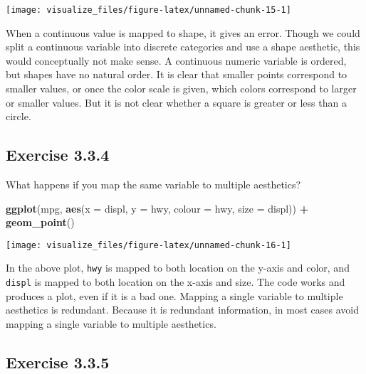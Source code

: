 \documentclass[]{book}
\newenvironment{Shaded}{\begin{snugshade}}{\end{snugshade}}
\newcommand{\DataTypeTok}[1]{\textcolor[rgb]{0.13,0.29,0.53}{#1}}
\newcommand{\KeywordTok}[1]{\textcolor[rgb]{0.13,0.29,0.53}{\textbf{#1}}}
\newcommand{\NormalTok}[1]{#1}
\newcommand{\OperatorTok}[1]{\textcolor[rgb]{0.81,0.36,0.00}{\textbf{#1}}}
\newcommand{\StringTok}[1]{\textcolor[rgb]{0.31,0.60,0.02}{#1}}
\theoremstyle{plain}
\theoremstyle{remark}
\begin{document}
\begin{center}\texttt{[image: visualize\_files/figure-latex/unnamed-chunk-15-1]} \end{center}

When a continuous value is mapped to shape, it gives an error. Though we
could split a continuous variable into discrete categories and use a
shape aesthetic, this would conceptually not make sense. A continuous
numeric variable is ordered, but shapes have no natural order. It is
clear that smaller points correspond to smaller values, or once the
color scale is given, which colors correspond to larger or smaller
values. But it is not clear whether a square is greater or less than a
circle.

\hypertarget{exercise-3.3.4}{%
\subsection*{\texorpdfstring{Exercise
{3.3.4}}{Exercise 3.3.4}}\label{exercise-3.3.4}}

What happens if you map the same variable to multiple aesthetics?

\begin{Shaded}
\begin{Highlighting}[]
\KeywordTok{ggplot}\NormalTok{(mpg, }\KeywordTok{aes}\NormalTok{(}\DataTypeTok{x =}\NormalTok{ displ, }\DataTypeTok{y =}\NormalTok{ hwy, }\DataTypeTok{colour =}\NormalTok{ hwy, }\DataTypeTok{size =}\NormalTok{ displ)) }\OperatorTok{+}
\StringTok{  }\KeywordTok{geom_point}\NormalTok{()}
\end{Highlighting}
\end{Shaded}

\begin{center}\texttt{[image: visualize\_files/figure-latex/unnamed-chunk-16-1]} \end{center}

In the above plot, \texttt{hwy} is mapped to both location on the y-axis
and color, and \texttt{displ} is mapped to both location on the x-axis
and size. The code works and produces a plot, even if it is a bad one.
Mapping a single variable to multiple aesthetics is redundant. Because
it is redundant information, in most cases avoid mapping a single
variable to multiple aesthetics.

\hypertarget{exercise-3.3.5}{%
\subsection*{\texorpdfstring{Exercise
{3.3.5}}{Exercise 3.3.5}}\label{exercise-3.3.5}}
\end{document}
